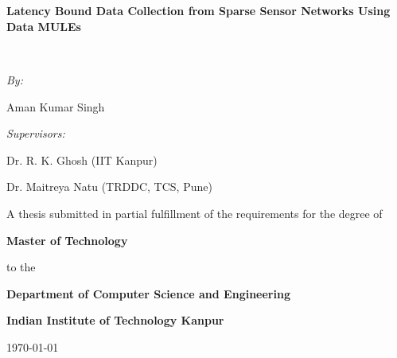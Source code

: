 \setcounter{page}{1}
\thispagestyle{empty}
\begin{titlepage}
\begin{center}



\textsc{\Large }\\[0.5cm]

\HRule \\[0.4cm]
{ \huge \bfseries Latency Bound Data Collection from Sparse Sensor Networks Using Data MULEs \\[0.4cm] }

\HRule \\[1.5cm]

\begin{minipage}{0.4\textwidth}
\begin{flushleft} \large
\emph{By:}

Aman Kumar Singh
\end{flushleft}
\end{minipage}
\begin{minipage}{0.4\textwidth}
\begin{flushright} \large
\emph{Supervisors:}

Dr. R. K. Ghosh (IIT Kanpur)

Dr. Maitreya Natu (TRDDC, TCS, Pune)
\end{flushright}
\end{minipage}

\vspace{5cm}

A thesis submitted in partial fulfillment of the requirements for the degree of

{\bf Master of Technology}

to the

{\bf Department of Computer Science and Engineering}

{\bf Indian Institute of Technology Kanpur}

\vfill

{\large \today}

\end{center}
\end{titlepage}
